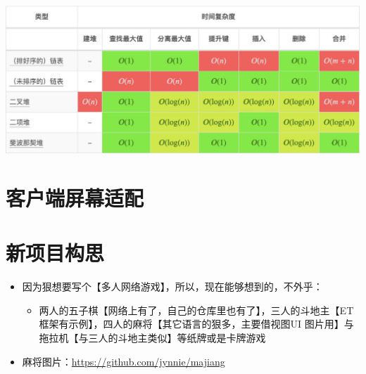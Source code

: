 \documentclass[9pt, b5paper]{article}
\begin{document}
\begin{center}
\includegraphics[width=.9\linewidth]{./pic/bigo5.jpeg}
\end{center}

\section{客户端屏幕适配}
\label{sec:orgb1df01e}
\section{新项目构思}
\label{sec:org6e37677}
\begin{itemize}
\item 因为狠想要写个【多人网络游戏】，所以，现在能够想到的，不外乎：
\begin{itemize}
\item 两人的五子棋【网络上有了，自己的仓库里也有了】，三人的斗地主【ET 框架有示例】，四人的麻将【其它语言的狠多，主要借视图UI 图片用】与拖拉机【与三人的斗地主类似】等纸牌或是卡牌游戏
\end{itemize}
\item 麻将图片：\url{https://github.com/jynnie/majiang}
\end{itemize}
\end{document}
